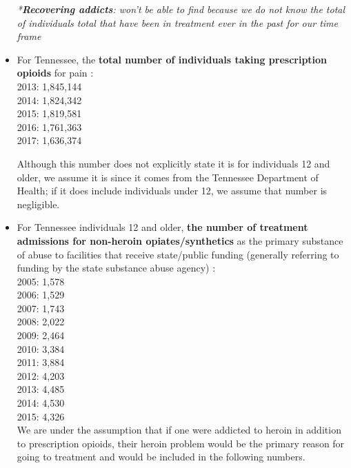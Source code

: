 \documentclass[12pt]{article}
\begin{document}
\begin{itemize}

\textit{*\textbf{Recovering addicts}: won't be able to find because we do not know the total of individuals total that have been in treatment ever in the past for our time frame}  \\



\item For Tennessee, the \textbf{total number of individuals taking prescription opioids} for pain \cite{TNgov1}: \\
2013: 1,845,144 \\
2014: 1,824,342 \\
2015: 1,819,581 \\
2016: 1,761,363 \\
2017: 1,636,374 

Although this number does not explicitly state it is for individuals 12 and older, we assume it is since it comes from the Tennessee Department of Health; if it does include individuals under 12, we assume that number is negligible. \\

\item For Tennessee individuals 12 and older, \textbf{the number of treatment admissions for non-heroin opiates/synthetics} as the primary substance of abuse to facilities that receive state/public funding (generally referring to funding by the state substance abuse agency) \cite{TEDS2015_SAMSHA_admissions}: \\
2005: 1,578 \\
2006: 1,529 \\
2007: 1,743 \\
2008: 2,022 \\
2009: 2,464 \\
2010: 3,384 \\
2011: 3,884 \\
2012: 4,203 \\
2013: 4,485 \\
2014: 4,530 \\
2015: 4,326 \\

We are under the assumption that if one were addicted to heroin in addition to prescription opioids, their heroin problem would be the primary reason for going to treatment and would be included in the following numbers. 


\end{itemize}
\end{document}
